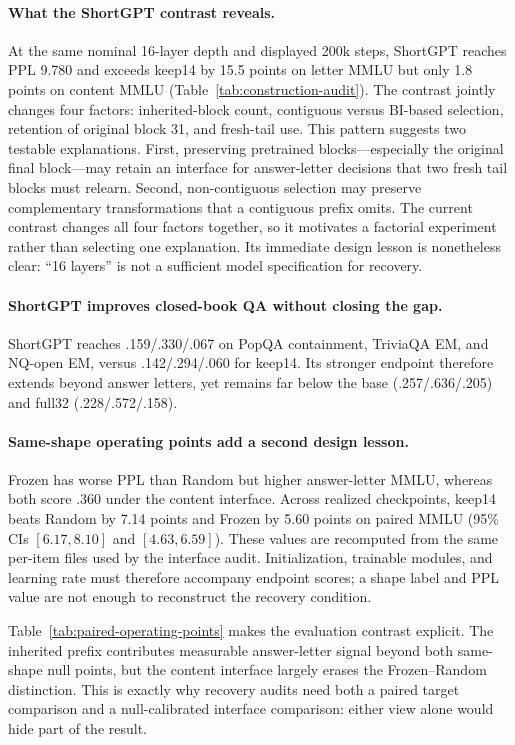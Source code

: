 \paragraph{What the ShortGPT contrast reveals.}
At the same nominal 16-layer depth and displayed 200k steps, ShortGPT reaches
PPL 9.780 and exceeds keep14 by 15.5 points on letter MMLU but only 1.8 points
on content MMLU (Table~\ref{tab:construction-audit}). The contrast jointly
changes four factors: inherited-block count, contiguous versus BI-based
selection, retention of original block 31, and fresh-tail use.
This pattern suggests two testable explanations. First, preserving pretrained
blocks---especially the original final block---may retain an interface for
answer-letter decisions that two fresh tail blocks must relearn. Second,
non-contiguous selection may preserve complementary transformations that a
contiguous prefix omits. The current contrast changes all four factors
together, so it motivates a factorial experiment rather than selecting one
explanation. Its immediate design lesson is nonetheless clear: ``16 layers''
is not a sufficient model specification for recovery.

\paragraph{ShortGPT improves closed-book QA without closing the gap.}
ShortGPT reaches .159/.330/.067 on PopQA containment, TriviaQA EM, and NQ-open
EM, versus .142/.294/.060 for keep14. Its stronger endpoint therefore extends
beyond answer letters, yet remains far below the base (.257/.636/.205) and
full32 (.228/.572/.158).

\paragraph{Same-shape operating points add a second design lesson.}
Frozen has worse PPL than Random but higher answer-letter MMLU, whereas both
score .360 under the content interface. Across realized checkpoints, keep14
beats Random by 7.14 points and Frozen by 5.60 points on paired MMLU
(95\% CIs $[6.17,8.10]$ and $[4.63,6.59]$). These values are recomputed from
the same per-item files used by the interface audit. Initialization, trainable modules,
and learning rate must therefore accompany endpoint scores; a shape label and
PPL value are not enough to reconstruct the recovery condition.


Table~\ref{tab:paired-operating-points} makes the evaluation contrast explicit.
The inherited prefix contributes measurable answer-letter signal beyond both
same-shape null points, but the content interface largely erases the
Frozen--Random distinction. This is exactly why recovery audits need both a
paired target comparison and a null-calibrated interface comparison: either
view alone would hide part of the result.
